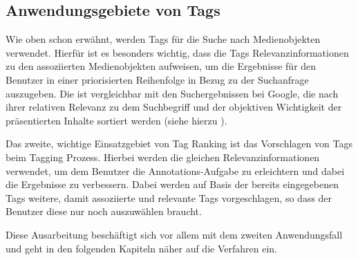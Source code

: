 
\subsection{Anwendungsgebiete von Tags} %
\label{sub:anwendungsgebiete}

Wie oben schon erwähnt, werden Tags für die Suche nach Medienobjekten verwendet. Hierfür ist es besonders wichtig, dass die Tags Relevanzinformationen zu den assoziierten Medienobjekten aufweisen, um die Ergebnisse für den Benutzer in einer priorisierten Reihenfolge in Bezug zu der Suchanfrage auszugeben. Die ist vergleichbar mit den Suchergebnissen bei Google, die nach ihrer relativen Relevanz zu dem Suchbegriff und der objektiven Wichtigkeit der präsentierten Inhalte sortiert werden (siehe hierzu \cite{googlePageRank}).

Das zweite, wichtige Einsatzgebiet von Tag Ranking ist das Vorschlagen von Tags beim Tagging Prozess. Hierbei werden die gleichen Relevanzinformationen verwendet, um dem Benutzer die Annotations-Aufgabe zu erleichtern und dabei die Ergebnisse zu verbessern. Dabei werden auf Basis der bereits eingegebenen Tags weitere, damit assoziierte und relevante Tags vorgeschlagen, so dass der Benutzer diese nur noch auszuwählen braucht.

Diese Ausarbeitung beschäftigt sich vor allem mit dem zweiten Anwendungsfall und geht in den folgenden Kapiteln näher auf die Verfahren ein.
